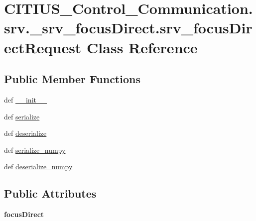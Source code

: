 \hypertarget{class_c_i_t_i_u_s___control___communication_1_1srv_1_1__srv__focus_direct_1_1srv__focus_direct_request}{\section{\-C\-I\-T\-I\-U\-S\-\_\-\-Control\-\_\-\-Communication.\-srv.\-\_\-srv\-\_\-focus\-Direct.\-srv\-\_\-focus\-Direct\-Request \-Class \-Reference}
\label{class_c_i_t_i_u_s___control___communication_1_1srv_1_1__srv__focus_direct_1_1srv__focus_direct_request}
}
\subsection*{\-Public \-Member \-Functions}
\begin{DoxyCompactItemize}
\item 
def \hyperlink{class_c_i_t_i_u_s___control___communication_1_1srv_1_1__srv__focus_direct_1_1srv__focus_direct_request_a0edf828e89b9917b60ff8652bb120532}{\-\_\-\-\_\-init\-\_\-\-\_\-}
\item 
def \hyperlink{class_c_i_t_i_u_s___control___communication_1_1srv_1_1__srv__focus_direct_1_1srv__focus_direct_request_a62a0eedf0b94ebeacd4356bc6581b95e}{serialize}
\item 
def \hyperlink{class_c_i_t_i_u_s___control___communication_1_1srv_1_1__srv__focus_direct_1_1srv__focus_direct_request_a17013482af91c57ba729883501a513da}{deserialize}
\item 
def \hyperlink{class_c_i_t_i_u_s___control___communication_1_1srv_1_1__srv__focus_direct_1_1srv__focus_direct_request_aa0d9efae23325f5f403081c5dfdac4e0}{serialize\-\_\-numpy}
\item 
def \hyperlink{class_c_i_t_i_u_s___control___communication_1_1srv_1_1__srv__focus_direct_1_1srv__focus_direct_request_ab1242d74d03a20775018ec9ee357adfc}{deserialize\-\_\-numpy}
\end{DoxyCompactItemize}
\subsection*{\-Public \-Attributes}
\begin{DoxyCompactItemize}
\item 
\hypertarget{class_c_i_t_i_u_s___control___communication_1_1srv_1_1__srv__focus_direct_1_1srv__focus_direct_request_a9bc24187df1e3eeedcaa190512319aba}{{\bfseries focus\-Direct}}\label{class_c_i_t_i_u_s___control___communication_1_1srv_1_1__srv__focus_direct_1_1srv__focus_direct_request_a9bc24187df1e3eeedcaa190512319aba}

\end{DoxyCompactItemize}
